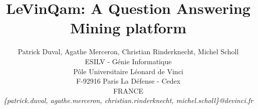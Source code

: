 \documentclass[10pt,twocolumn]{IEEEtran}
\begin{document}
\title{\LARGE \bf LeVinQam: A Question Answering Mining platform}

\author{
\large Patrick Duval, Agathe Merceron, Christian Rinderknecht, Michel Scholl \\
\normalsize ESILV - G\'enie Informatique\\
\normalsize P\^ole Universitaire L\'eonard de Vinci\\
\normalsize F-92916 Paris La D\'efense - Cedex \\
\normalsize FRANCE \\
\normalsize {\it \{patrick.duval, agathe.merceron, christian.rinderknecht, michel.scholl\}@devinci.fr}
}

\end{document}
